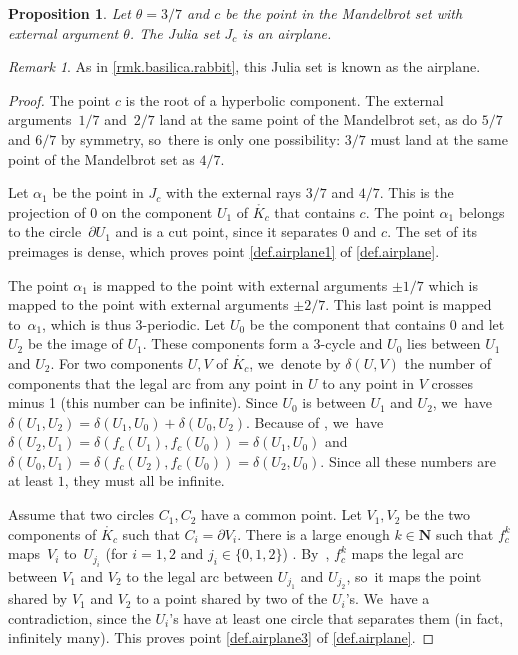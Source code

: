 \documentclass[JEP,XML,SOM,Unicode,NoFloatCountersInSection,published]{cedram}
\theoremstyle{plain}
\newtheorem{proposition}[theorem]{Proposition}
\theoremstyle{definition}
\theoremstyle{remark}
\newtheorem{remark}[theorem]{Remark}
\begin{document}

\begin{proposition}
\label{sub.airplane.julia.set}
Let $\theta=3/7$ and $c$ be the point in the Mandelbrot set with external argument $\theta$.
The Julia set $J_c$ is an airplane.
\end{proposition}

\begin{remark}
As in \cref{rmk.basilica.rabbit}, this Julia set is known as the airplane.
\end{remark}

\begin{proof}
The point $c$ is the root of a hyperbolic component.
The external arguments~$1/7$ and~$2/7$ land at the same point of the Mandelbrot set, as do $5/7$ and $6/7$ by symmetry, so~there is only one possibility: $3/7$ must land at the same point of the Mandelbrot set as $4/7$.

Let $\alpha_1$ be the point in $J_c$ with the external rays $3/7$ and $4/7$.
This is the projection of $0$ on the component $U_1$ of $\mathring{K_c}$ that contains $c$.
The point $\alpha_1$ belongs to the circle~$\partial U_1$ and is a cut point, since it separates $0$ and $c$.
The set of its preimages is dense, which proves point \cref{def.airplane1} of \cref{def.airplane}.

The point $\alpha_1$ is mapped to the point with external arguments $\pm1/7$ which is mapped to the point with external arguments $\pm2/7$.
This last point is mapped to~$\alpha_1$, which is thus 3-periodic.
Let $U_0$ be the component that contains $0$ and let $U_2$ be the image of $U_1$.
These components form a 3-cycle and $U_0$ lies between $U_1$ and $U_2$.
For two components $U,V$ of $\mathring{K_c}$, we~denote by $\delta(U,V)$ the number of components that the legal arc from any point in $U$ to any point in $V$ crosses minus 1 (this number can be infinite).
Since $U_0$ is between $U_1$ and $U_2$, we~have $\delta(U_1,U_2)=\delta(U_1,U_0)+\delta(U_0,U_2)$. Because of \cite[Exp.\,IV, Lem.\,1]{douady-hubbard-I}, we~have $\delta(U_2,U_1)=\delta(f_c(U_1),f_c(U_0))=\delta(U_1,U_0)$ and $\delta(U_0,U_1)=\delta(f_c(U_2),f_c(U_0))=\delta(U_2,U_0)$.
Since all these numbers are at least $1$, they must all be infinite.

Assume that two circles $C_1,C_2$ have a common point.
Let $V_1,V_2$ be the two components of $\mathring{K_c}$ such that $C_i=\partial V_i$.
There is a large enough $k\in\mathbf{N}$ such that $f_c^k$ maps~$V_i$ to~$U_{j_i}$ (for $i=1,2$ and $j_i \in \{0,1,2\}$) . By~\cite[Exp.\,IV, Lem.\,1]{douady-hubbard-I}, $f_c^k$ maps the legal arc between $V_1$ and $V_2$ to the legal arc between $U_{j_1}$ and $U_{j_2}$, so~it maps the point shared by $V_1$ and $V_2$ to a point shared by two of the $U_i$'s. We~have a contradiction, since the $U_i$'s have at least one circle that separates them (in fact, infinitely many).
This proves point \cref{def.airplane3} of \cref{def.airplane}.


\end{proof}
\end{document}
